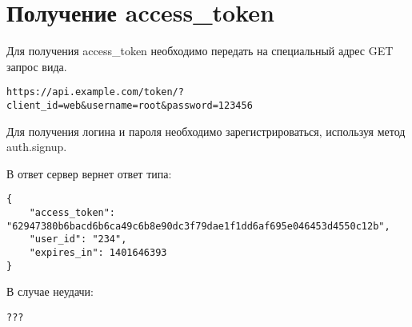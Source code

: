 \section{Получение access\_token}
\par
Для получения access\_token необходимо передать на специальный адрес GET запрос вида. \\


\begin{Verbatim}[frame=single]
https://api.example.com/token/?client_id=web&username=root&password=123456
\end{Verbatim}

Для получения логина и пароля необходимо зарегистрироваться, используя метод auth.signup.

В ответ сервер вернет ответ типа:
\begin{Verbatim}[frame=single]
{
    "access_token": "62947380b6bacd6b6ca49c6b8e90dc3f79dae1f1dd6af695e046453d4550c12b",
    "user_id": "234",
    "expires_in": 1401646393
}
\end{Verbatim}

В случае неудачи:


\begin{Verbatim}[frame=single]
???
\end{Verbatim}
